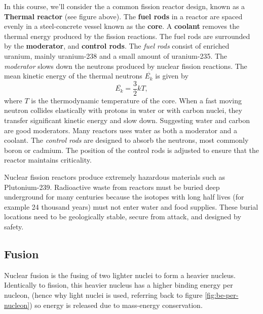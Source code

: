 In this course, we'll consider the a common fission reactor design, known as a \textbf{Thermal reactor} (see figure above). 
The \textbf{fuel rods} in a reactor are spaced evenly in a steel-concrete vessel known as the \textbf{core}. A \textbf{coolant} removes the thermal energy produced by the fission reactions. The fuel rods are surrounded by the \textbf{moderator}, and \textbf{control rods}. The \textit{fuel rods} consist of enriched uranium, mainly uranium-238 and a small amount of uranium-235. The \textit{moderator} slows down the neutrons produced by nuclear fission reactions. The mean kinetic energy of the thermal neutrons $\overline{E_k}$ is given by
\begin{equation}
    \overline{E_k} = \frac{3}{2}kT,
\end{equation}
where $T$ is the thermodynamic temperature of the core. When a fast moving neutron collides elastically with protons in water or with carbon nuclei, they transfer significant kinetic energy and slow down. Suggesting water and carbon are good moderators. Many reactors uses water as both a moderator and a coolant. The \textit{control rods} are designed to absorb the neutrons, most commonly boron or cadmium. The position of the control rods is adjusted to ensure that the reactor maintains criticality. 

Nuclear fission reactors produce extremely hazardous materials such as Plutonium-239. Radioactive waste from reactors must be buried deep underground for many centuries because the isotopes with long half lives (for example 24 thousand years) must not enter water and food supplies. These burial locations need to be geologically stable, secure from attack, and designed by safety. 

\subsection{Fusion}
Nuclear fusion is the fusing of two lighter nuclei to form a heavier nucleus. Identically to fission, this heavier nucleus has a higher binding energy per nucleon, (hence why light nuclei is used, referring back to figure \ref{fig:be-per-nucleon}) so energy is released due to mass-energy conservation. 

